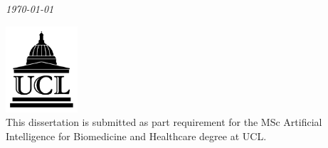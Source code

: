 \documentclass[11pt,a4paper,oneside]{book}
\begin{document}
\begin{titlepage}
	{\large\textit\today} %
	
       \includegraphics[width=0.2\textwidth]{ucl_logo}\\[1cm] %
	
	
	 This dissertation is submitted as part requirement for the MSc Artificial Intelligence for Biomedicine and Healthcare degree at UCL. 
     
	 

	

	
\end{titlepage}
\clearpage 
\newpage 

 
\end{document}
